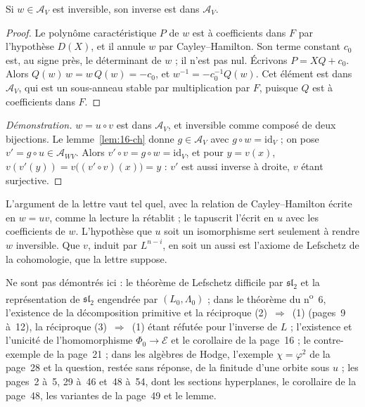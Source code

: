 \begin{lemme}\label{lem:16-ch}
Si $w \in \mathcal A_V$ est inversible, son inverse est dans $\mathcal A_V$.
\end{lemme}

\begin{proof}
Le polynôme caractéristique $P$ de $w$ est à coefficients dans $F$ par l'hypothèse $D(X)$, et il annule $w$ par Cayley--Hamilton. Son terme constant $c_0$ est, au signe près, le déterminant de $w$ ; il n'est pas nul. Écrivons $P = XQ + c_0$. Alors $Q(w)\,w = w\,Q(w) = -c_0$, et $w^{-1} = -c_0^{-1}Q(w)$. Cet élément est dans $\mathcal A_V$, qui est un sous-anneau stable par multiplication par $F$, puisque $Q$ est à coefficients dans $F$.
\end{proof}

\begin{proof}[Démonstration]
$w = u \circ v$ est dans $\mathcal A_V$, et inversible comme composé de deux bijections. Le lemme~\ref{lem:16-ch} donne $g \in \mathcal A_V$ avec $g \circ w = \mathrm{id}_V$ ; on pose $v' = g \circ u \in \mathcal A_{WV}$. Alors $v' \circ v = g \circ w = \mathrm{id}_V$, et pour $y = v(x)$, $v(v'(y)) = v\bigl((v' \circ v)(x)\bigr) = y$ : $v'$ est aussi inverse à droite, $v$ étant surjective.
\end{proof}

\begin{remarque}
L'argument de la lettre vaut tel quel, avec la relation de Cayley--Hamilton écrite en $w = uv$, comme la lecture la rétablit ; le tapuscrit l'écrit en $u$ avec les coefficients de $w$. L'hypothèse que $u$ soit un isomorphisme sert seulement à rendre $w$ inversible. Que $v$, induit par $L^{n-i}$, en soit un aussi est l'axiome de Lefschetz de la cohomologie, que la lettre suppose.
\end{remarque}

Ne sont pas démontrés ici : le théorème de Lefschetz difficile par $\mathfrak{sl}_2$ et la représentation de $\mathfrak{sl}_2$ engendrée par $(L_0, \Lambda_0)$ ; dans le théorème du n\textsuperscript{o}~6, l'existence de la décomposition primitive et la réciproque (2)~$\Rightarrow$~(1) (pages~9 à~12), la réciproque (3)~$\Rightarrow$~(1) étant réfutée pour l'inverse de $L$ ; l'existence et l'unicité de l'homomorphisme $\Phi_0 \to \mathcal E$ et le corollaire de la page~16 ; le contre-exemple de la page~21 ; dans les algèbres de Hodge, l'exemple $\chi = \varphi^2$ de la page~28 et la question, restée sans réponse, de la finitude d'une orbite sous $u$ ; les pages~2 à~5, 29 à~46 et~48 à~54, dont les sections hyperplanes, le corollaire de la page~48, les variantes de la page~49 et le lemme.

